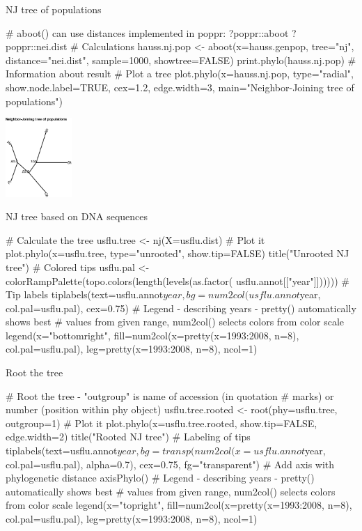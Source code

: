 \documentclass[compress, ucs, xelatex, 11pt, xcolor=svgnames,
  hyperref={
    bookmarks=true,
    unicode=true,
    colorlinks=true,
    pdftitle={Molecular data in R},
    plainpages=false,
    pdfauthor={Vojtech Zeisek},
    pdfsubject={Course about phylogeny and evolution in R},
    pdfcreator={XeLaTeX},
    pdfkeywords={R, evolution, phylogeny, molecular data},
    linkcolor=Tomato,
    anchorcolor=SaddleBrown,
    citecolor=Goldenrod,
    filecolor=DarkMagenta,
    menucolor=Sienna,
    urlcolor=DarkTurquoise,
    pdftex},
  url={hyphens, lowtilde} %
  ]{beamer}
\begin{document}
\begin{frame}[fragile]{NJ tree of populations}
  \begin{spluscode}
    # aboot() can use distances implemented in poppr:
    ?poppr::aboot
    ?poppr::nei.dist
    # Calculations
    hauss.nj.pop <- aboot(x=hauss.genpop, tree="nj", distance="nei.dist",
      sample=1000, showtree=FALSE)
    print.phylo(hauss.nj.pop) # Information about result
    # Plot a tree
    plot.phylo(x=hauss.nj.pop, type="radial", show.node.label=TRUE,
      cex=1.2, edge.width=3, main="Neighbor-Joining tree of populations")
  \end{spluscode}
  \begin{center}
    \includegraphics[height=3cm]{nj_pop.png}
  \end{center}
\end{frame}

\begin{frame}[fragile]{NJ tree based on DNA sequences}
  \begin{spluscode}
    # Calculate the tree
    usflu.tree <- nj(X=usflu.dist)
    # Plot it
    plot.phylo(x=usflu.tree, type="unrooted", show.tip=FALSE)
    title("Unrooted NJ tree")
    # Colored tips
    usflu.pal <- colorRampPalette(topo.colors(length(levels(as.factor(
      usflu.annot[["year"]])))))
    # Tip labels
    tiplabels(text=usflu.annot$year, bg=num2col(usflu.annot$year,
      col.pal=usflu.pal), cex=0.75)
    # Legend - describing years - pretty() automatically shows best
    # values from given range, num2col() selects colors from color scale
    legend(x="bottomright", fill=num2col(x=pretty(x=1993:2008, n=8),
      col.pal=usflu.pal), leg=pretty(x=1993:2008, n=8), ncol=1)
  \end{spluscode}
\end{frame}

\begin{frame}[fragile]{Root the tree}
  \begin{spluscode}
    # Root the tree - "outgroup" is name of accession (in quotation
    # marks) or number (position within phy object)
    usflu.tree.rooted <- root(phy=usflu.tree, outgroup=1)
    # Plot it
    plot.phylo(x=usflu.tree.rooted, show.tip=FALSE, edge.width=2)
    title("Rooted NJ tree")
    # Labeling of tips
    tiplabels(text=usflu.annot$year, bg=transp(num2col(x=usflu.annot$year,
      col.pal=usflu.pal), alpha=0.7), cex=0.75, fg="transparent")
    # Add axis with phylogenetic distance
    axisPhylo()
    # Legend - describing years - pretty() automatically shows best
    # values from given range, num2col() selects colors from color scale
    legend(x="topright", fill=num2col(x=pretty(x=1993:2008, n=8),
      col.pal=usflu.pal), leg=pretty(x=1993:2008, n=8), ncol=1)
  \end{spluscode}
\end{frame}
\end{document}
